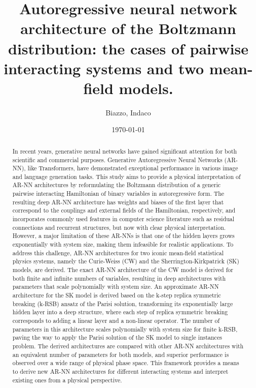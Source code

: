 \documentclass[aps,physrev,10pt,floatfix,reprint]{revtex4-2}
\begin{document}
\title{Autoregressive neural network architecture of the Boltzmann distribution: the cases of pairwise interacting systems and two mean-field models.}
\author{Biazzo, Indaco}
\date{\today}

\begin{abstract}
    In recent years, generative neural networks have gained significant attention for both scientific and commercial purposes. Generative Autoregressive Neural Networks (AR-NN), like Transformers, have demonstrated exceptional performance in various image and language generation tasks. This study aims to provide a physical interpretation of AR-NN architectures by reformulating the Boltzmann distribution of a generic pairwise interacting Hamiltonian of binary variables in autoregressive form. The resulting deep AR-NN architecture has weights and biases of the first layer that correspond to the couplings and external fields of the Hamiltonian, respectively, and incorporates commonly used features in computer science literature such as residual connections and recurrent structures, but now with clear physical interpretation. However, a major limitation of these AR-NNs is that one of the hidden layers grows exponentially with system size, making them infeasible for realistic applications. To address this challenge, AR-NN architectures for two iconic mean-field statistical physics systems, namely the Curie-Weiss (CW) and the Sherrington-Kirkpatrick (SK) models, are derived. The exact AR-NN architecture of the CW model is derived for both finite and infinite numbers of variables, resulting in deep architectures with parameters that scale polynomially with system size. An approximate AR-NN architecture for the SK model is derived based on the k-step replica symmetric breaking (k-RSB) ansatz of the Parisi solution, transforming its exponentially large hidden layer into a deep structure, where each step of replica symmetric breaking corresponds to adding a linear layer and a non-linear operator. The number of parameters in this architecture scales polynomially with system size for finite k-RSB, paving the way to apply the Parisi solution of the SK model to single instances problem. The derived architectures are compared with other AR-NN architectures with an equivalent number of parameters for both models, and superior performance is observed over a wide range of physical phase space. This framework provides a means to derive new AR-NN architectures for different interacting systems and interpret existing ones from a physical perspective.
\end{abstract}
    
\end{document}
